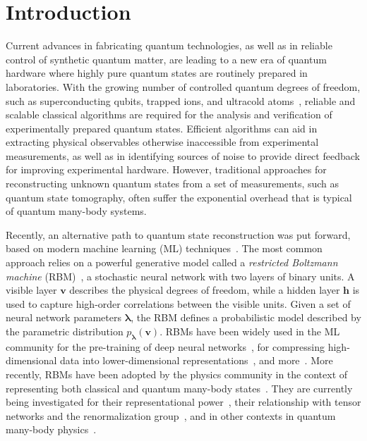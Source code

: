 \documentclass[submission, Phys, hidelnks]{SciPost}
\begin{document}
\section{Introduction}
Current advances in fabricating quantum technologies, as well as in reliable
control of synthetic quantum matter, are leading to a new era of quantum
hardware where highly pure quantum states are routinely prepared in laboratories.
With the growing number of controlled quantum degrees of freedom, such as
superconducting qubits, trapped ions, and ultracold
atoms~\cite{kandala_hardware-efficient_2017,moll_quantum_2018,bernien_probing_2017,zhang_observation_2017}, reliable and scalable
classical algorithms are required for the analysis and verification of
experimentally prepared quantum states. Efficient algorithms can aid in
extracting physical observables otherwise inaccessible from experimental
measurements, as well as in identifying sources of noise to provide direct
feedback for improving experimental hardware. However, traditional approaches
for reconstructing unknown quantum states from a set of measurements, such as
quantum state tomography, often suffer the exponential overhead that is typical
of quantum many-body systems.

Recently, an alternative path to quantum state reconstruction was put forward,
based on modern machine learning (ML)
techniques~\cite{torlai_neural-network_2018,torlai_latent_2018,carrasquilla_reconstructing_2018,lennon_efficiently_2018,kim_mixed_2018}.
The most common approach relies on a powerful generative model called a
\textit{restricted Boltzmann machine} (RBM)~\cite{smolensky_information_1986},
a stochastic neural network with two layers of binary units.
A visible layer $\bm{v}$ describes the physical degrees of freedom, while a
hidden layer $\bm{h}$ is used to capture high-order correlations between the
visible units. Given a set of neural network parameters
 $\bm{\lambda}$, the RBM defines a probabilistic model described by the
 parametric distribution $p_{\bm{\lambda}}(\bm{v})$.
RBMs have been widely used in the ML community for the pre-training of deep
neural networks~\cite{hinton_training_2002}, for compressing high-dimensional
data into lower-dimensional representations~\cite{hinton_reducing_2006}, and
more~\cite{lecun_deep_2015}.
More recently, RBMs have been adopted by the physics community in the context
of representing both classical and quantum many-body
states~\cite{torlai_learning_2016,CarleoTroyer2017Science,carleo_constructing_2018}.
They are currently being investigated for their representational
power~\cite{gao_efficient_2017,choo_symmetries_2018,glasser_neural-network_2018},
their relationship with tensor networks and the renormalization
group~\cite{mehta_exact_2014,koch-janusz_mutual_2018,iso_scale-invariant_2018,lenggenhager_optimal_2018,chen_equivalence_2018},
and in other contexts in quantum many-body physics~\cite{PhysRevB.96.205152,weinstein_neural_2018,RBM_stabilizer}.
\end{document}
